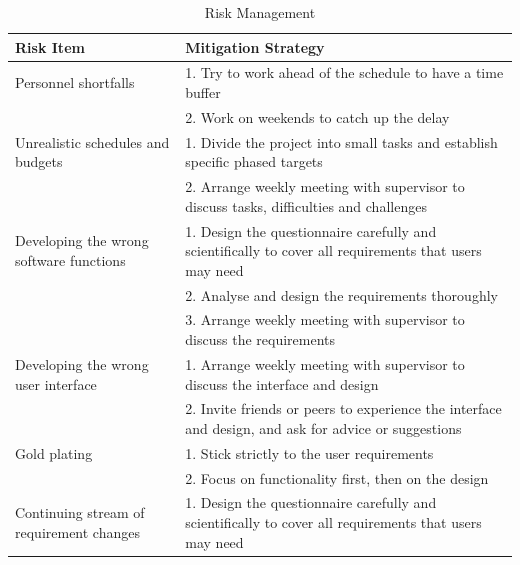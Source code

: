 \begin{table}[H]
\centering
\caption{Risk Management}
\label{my-label}
\begin{tabular}{|p{4cm}|p{10cm}|}
\hline
\textbf{Risk Item}                       & \textbf{Mitigation Strategy}                                                                               \\ \hline
Personnel shortfalls                     & 1. Try to work ahead of the schedule to have a time buffer                                             \\
                                         & 2. Work on weekends to catch up the delay                                                              \\ \hline
Unrealistic schedules and budgets        & 1. Divide the project into small tasks and establish specific phased targets                           \\
                                         & 2. Arrange weekly meeting with supervisor to discuss tasks, difficulties and challenges                \\ \hline
Developing the wrong software functions  & 1. Design the questionnaire carefully and scientifically to cover all requirements that users may need \\
                                         & 2. Analyse and design the requirements thoroughly                                                      \\
                                         & 3. Arrange weekly meeting with supervisor to discuss the requirements                                  \\ \hline
Developing the wrong user interface      & 1. Arrange weekly meeting with supervisor to discuss the interface and design                          \\
                                         & 2. Invite friends or peers to experience the interface and design, and ask for advice or suggestions   \\ \hline
Gold plating                             & 1. Stick strictly to the user requirements                                                             \\
                                         & 2. Focus on functionality first, then on the design                                                    \\ \hline
Continuing stream of requirement changes & 1. Design the questionnaire carefully and scientifically to cover all requirements that users may need \\

\end{tabular}
\end{table}
